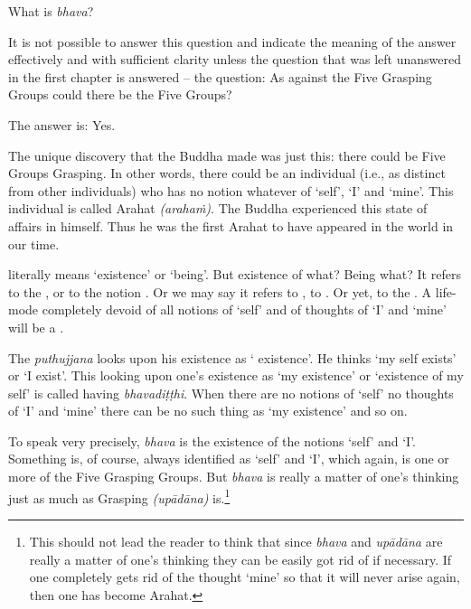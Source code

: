 What is \emph{bhava}?

It is not possible to answer this question and indicate the meaning of the answer effectively and with sufficient clarity unless the question that was left unanswered in the first chapter is answered -- the question: As against the Five Grasping Groups could there be  the Five Groups?

The answer is: Yes.

The unique discovery that the Buddha made was just this: there could be Five Groups  Grasping. In other words, there could be an individual (i.e., as distinct from other individuals) who has no notion whatever of `self', `I' and `mine'. This individual is called Arahat \emph{(arahaṁ)}.  The Buddha experienced this state of affairs in himself. Thus he was the first Arahat to have appeared in the world in our time.

 literally means `existence' or `being'. But existence of what? Being what? It refers to the , or to the notion . Or we may say it refers to , to . Or yet, to the . A life-mode completely devoid of all notions of `self' and of thoughts of `I' and `mine' will  be a .

The \emph{puthujjana} looks upon his existence as ` existence'. He thinks `my self exists' or `I exist'. This looking upon one's existence as `my existence' or `existence of my self' is called having \emph{bhavadiṭṭhi}. When there are no notions of `self' no thoughts of `I' and `mine' there can be no such thing as `my existence' and so on.

To speak very precisely, \emph{bhava} is the existence of the notions `self' and `I'. Something is, of course, always identified as `self' and `I', which again, is one or more of the Five Grasping Groups. But \emph{bhava} is really a matter of one's thinking just as much as Grasping \emph{(upādāna)} is.\footnote{This should not lead the reader to think that since \emph{bhava} and \emph{upādāna} are really a matter of one's thinking they can be easily got rid of if necessary. If one completely gets rid of the thought `mine' so that it will never arise again, then one has become Arahat.}

